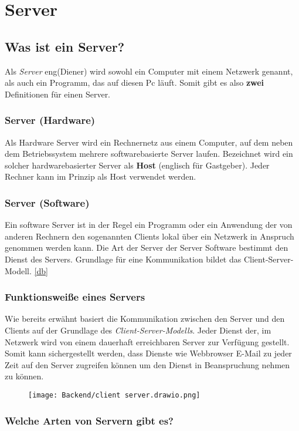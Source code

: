 \section{Server}

\subsection{Was ist ein Server?}
Als \textit{Server} eng(Diener) wird sowohl ein Computer mit einem Netzwerk genannt,
als auch ein Programm, das auf diesen Pc läuft. Somit gibt es also \textbf{zwei} Definitionen
für einen Server.

\subsubsection{Server (Hardware)}
Als Hardware Server wird ein Rechnernetz aus einem Computer, auf dem neben dem Betriebssystem
mehrere softwarebasierte Server laufen. Bezeichnet wird ein solcher hardwarebasierter
Server als \textbf{Host} (englisch für Gastgeber). Jeder Rechner kann im Prinzip als Host verwendet
werden.

\subsubsection{Server (Software)}
Ein software Server ist in der Regel ein Programm oder ein Anwendung
der von anderen Rechnern den sogenannten Clients lokal über ein Netzwerk in Anspruch genommen
werden kann. Die Art der Server der Server Software bestimmt den Dienst des Servers. Grundlage für
eine Kommunikation bildet das Client-Server-Modell. \ref{db}

\subsubsection{Funktionsweiße eines Servers}
Wie bereits erwähnt basiert die Kommunikation zwischen den Server und den Clients
auf der Grundlage des \textit{Client-Server-Modells}. Jeder Dienst der, im Netzwerk wird von
einem dauerhaft erreichbaren Server zur Verfügung gestellt. Somit kann sichergestellt werden, dass
Dienste wie Webbrowser E-Mail zu jeder Zeit auf den Server zugreifen können um den Dienst
in Beanspruchung nehmen zu können.

\begin{figure}[H]
    \centering
    \texttt{[image: Backend/client server.drawio.png]}
\end{figure}
\subsubsection{Welche Arten von Servern gibt es?}
